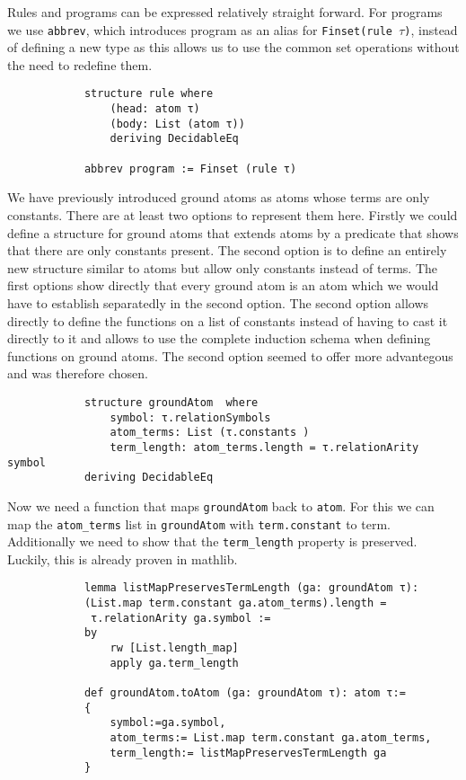 \documentclass{article}
\begin{document}
        Rules and programs can be expressed relatively straight forward. For programs we use \texttt{abbrev}, which introduces program as an alias for \texttt{Finset(rule $\tau$)},  instead of defining a new type as this allows us to use the common set operations without the need to redefine them.

        \begin{lstlisting}
            structure rule where
                (head: atom τ)
                (body: List (atom τ))
                deriving DecidableEq

            abbrev program := Finset (rule τ)
        \end{lstlisting}

        We have previously introduced ground atoms as atoms whose terms are only constants. There are at least two options to represent them here. Firstly we could define a structure for ground atoms that extends atoms by a predicate that shows that there are only constants present. The second option is to define an entirely new structure similar to atoms but allow only constants instead of terms. The first options show directly that every ground atom is an atom which we would have to establish separatedly in the second option. The second option allows directly to define the functions on a list of constants instead of having to cast it directly to it and allows to use the complete induction schema when defining functions on ground atoms. The second option seemed to offer more advantegous and was therefore chosen.

        \begin{lstlisting}
            structure groundAtom  where
                symbol: τ.relationSymbols
                atom_terms: List (τ.constants )
                term_length: atom_terms.length = τ.relationArity symbol
            deriving DecidableEq
        \end{lstlisting}

        Now we need a function that maps \texttt{groundAtom} back to \texttt{atom}. For this we can map the \texttt{atom\_terms} list in \texttt{groundAtom} with \texttt{term.constant} to term. Additionally we need to show that the \texttt{term\_length} property is preserved. Luckily, this is already proven in mathlib.


        \begin{lstlisting}
            lemma listMapPreservesTermLength (ga: groundAtom τ): 
            (List.map term.constant ga.atom_terms).length = 
             τ.relationArity ga.symbol :=
            by
                rw [List.length_map]
                apply ga.term_length

            def groundAtom.toAtom (ga: groundAtom τ): atom τ:= 
            {
                symbol:=ga.symbol,
                atom_terms:= List.map term.constant ga.atom_terms,
                term_length:= listMapPreservesTermLength ga
            }
        \end{lstlisting}
\end{document}
